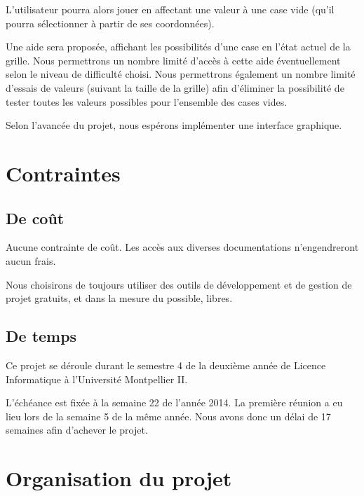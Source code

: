 \documentclass[a4paper, 12pt]{article}
\begin{document}
\par L'utilisateur pourra alors jouer en affectant une valeur à une case vide (qu'il pourra sélectionner à partir de ses coordonnées). 

\par Une aide sera proposée, affichant les possibilités d'une case en l'état actuel de la grille. Nous permettrons un nombre limité d'accès à cette aide éventuellement selon le niveau de difficulté choisi. Nous permettrons également un nombre limité d'essais de valeurs (suivant la taille de la grille) afin d'éliminer la possibilité de tester toutes les valeurs possibles pour l'ensemble des cases vides.

\par Selon l'avancée du projet, nous espérons implémenter une interface graphique.

\clearpage

\section{Contraintes}
\subsection{De coût}

\par Aucune contrainte de coût. Les accès aux diverses documentations n'engendreront aucun frais. 

\par Nous choisirons de toujours utiliser des outils de développement et de gestion de projet gratuits, et dans la mesure du possible, libres.

\subsection{De temps}

\par Ce projet se déroule durant le semestre 4 de la deuxième année de Licence Informatique à l'Université Montpellier II. 

\par L'échéance est fixée à la semaine 22 de l'année 2014. La première réunion a eu lieu lors de la semaine 5 de la même année. Nous avons donc un délai de 17 semaines afin d'achever le projet.

\clearpage

\section{Organisation du projet}
\end{document}
